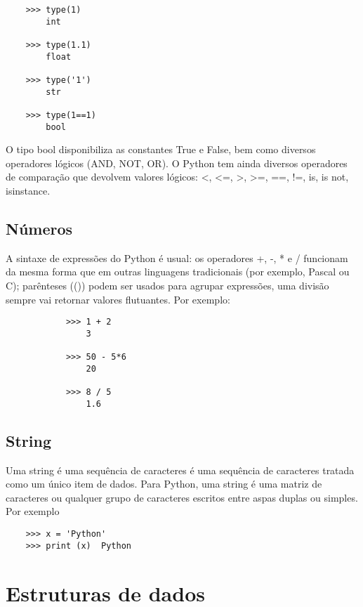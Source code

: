     
    \begin{lstlisting}
    >>> type(1)
        int
        
    >>> type(1.1)
        float
        
    >>> type('1')
        str
        
    >>> type(1==1)
        bool
    \end{lstlisting}    
    
    O tipo bool disponibiliza as constantes True e False, bem como diversos operadores lógicos (AND, NOT, OR). O Python tem ainda diversos operadores de comparação que devolvem valores lógicos: <, <=, >, >=, ==, !=, is, is not, isinstance.
    
            \subsection{Números}
            
            A sintaxe de expressões do Python é usual: os operadores +, -, * e / funcionam da mesma forma que em outras linguagens tradicionais (por exemplo, Pascal ou C); parênteses (()) podem ser usados para agrupar expressões, uma divisão sempre vai retornar valores flutuantes. Por exemplo:

            \begin{lstlisting}
            >>> 1 + 2
                3
                
            >>> 50 - 5*6
                20
                
            >>> 8 / 5 
                1.6
            \end{lstlisting}    
    
            \subsection{String}
           Uma string é uma sequência de caracteres é uma sequência de caracteres tratada como um único item de dados. Para Python, uma string é uma matriz de caracteres ou qualquer grupo de caracteres escritos entre aspas duplas ou simples. Por exemplo
    
    \begin{lstlisting}
    >>> x = 'Python'
    >>> print (x)  Python
    \end{lstlisting}


    \section{Estruturas de dados}
        
